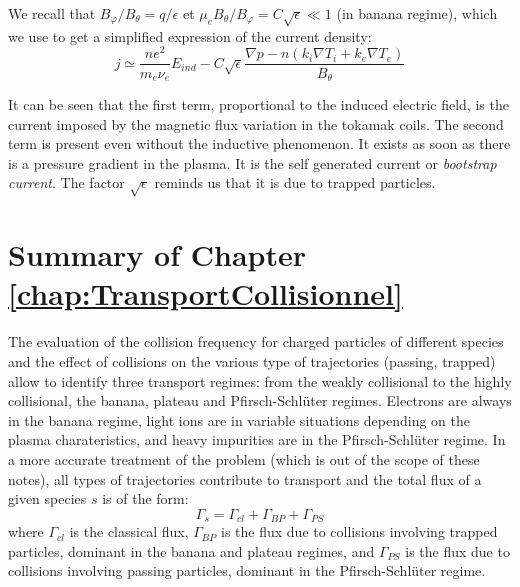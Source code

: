 We recall that $B_\varphi / B_\theta = q / \epsilon$ et $\mu_e B_\theta / B_\varphi = C\sqrt{\epsilon} \ll 1$ (in banana regime), which we use to get a simplified expression of the current density:
\[
		j \simeq \frac{ne^2}{m_e \nu_e}E_{ind} - C\sqrt{\epsilon} \frac{\nabla p - n\left( k_i\nabla T_i + k_e\nabla T_e \right)}{B_\theta}
\]

It can be seen that the first term, proportional to the induced electric field, is the current imposed by the magnetic flux variation in the tokamak coils. The second term is present even without the inductive phenomenon. It exists as soon as there is a pressure gradient in the plasma. It is the self generated current or \textit{bootstrap current}. The factor $\sqrt{\epsilon}$ reminds us that it is due to trapped particles. 


		
				
				

		\section{Summary of Chapter \ref{chap:TransportCollisionnel}}
		\label{sec:ConclusionNeoclassique}
		
The evaluation of the collision frequency for charged particles of different species and the effect of collisions on the various type of trajectories (passing, trapped) allow to identify three transport regimes: from the weakly collisional to the highly collisional, the banana, plateau and Pfirsch-Schlüter regimes. Electrons are always in the banana regime, light ions are in variable situations depending on the plasma charateristics, and heavy impurities are in the Pfirsch-Schlüter regime. In a more accurate treatment of the problem (which is out of the scope of these notes), all types of trajectories contribute to transport and the total flux of a given species $s$ is of the form:
\[
		\Gamma_s = \Gamma_{cl} + \Gamma_{BP} + \Gamma_{PS}
\]
where $\Gamma_{cl}$ is the classical flux, $\Gamma_{BP}$ is the flux due to collisions involving trapped particles, dominant in the banana and plateau regimes, and $\Gamma_{PS}$ is the flux due to collisions involving  passing particles, dominant in the Pfirsch-Schlüter regime.

